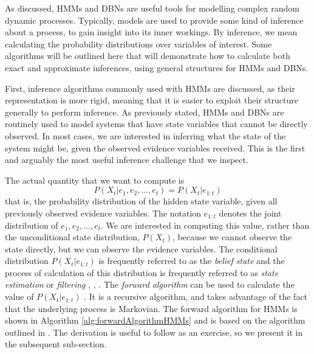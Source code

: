 As discussed, HMMs and DBNs are useful tools for modelling complex random dynamic processes. Typically, models are used to provide some kind of inference about a process, to gain insight into its inner workings. By inference, we mean calculating the probability distributions over variables of interest. Some algorithms will be outlined here that will demonstrate how to calculate both exact and approximate inferences, using general structures for HMMs and DBNs. \par

First, inference algorithms commonly used with HMMs are discussed, as their representation is more rigid, meaning that it is easier to exploit their structure generally to perform inference. As previously stated, HMMs and DBNs are routinely used to model systems that have state variables that cannot be directly observed. In most cases, we are interested in inferring what the state of the system might be, given the observed evidence variables received. This is the first and arguably the most useful inference challenge that we inspect.

The actual quantity that we want to compute is 
\[P(X_t | e_1, e_2, ..., e_t) = P(X_t | e_{1:t})\]
that is, the probability distribution of the hidden state variable, given all previously observed evidence variables. The notation $e_{1:t}$ denotes the joint distribution of $e_1, e_2, ..., e_t$. We are interested in computing this value, rather than the unconditional state distribution, $P(X_t)$, because we cannot observe the state directly, but we can observe the evidence variables. The conditional distribution $P(X_t | e_{1:t})$ is frequently referred to as the \textit{belief state} and the process of calculation of this distribution is frequently referred to as \textit{state estimation} or \textit{filtering} \cite{AIAMA}, \cite{Thrun:2005:ProbabilisticRobotics}, \cite{KollerPGM}. The \textit{forward algorithm} can be used to calculate the value of $P(X_t | e_{1:t})$ \cite[p.~572]{AIAMA}. It is a recursive algorithm, and takes advantage of the fact that the underlying process is Markovian. The forward algorithm for HMMs is shown in Algorithm \ref{alg:forwardAlgorithmHMMs} and is based on the algorithm outlined in \cite[p.~27]{Thrun:2005:ProbabilisticRobotics}. The derivation is useful to follow as an exercise, so we present it in the subsequent sub-section.
